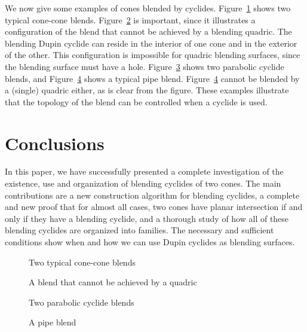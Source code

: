 We now give some examples of cones blended by cyclides.
Figure~\ref{fig:1} shows two typical cone-cone blends.
Figure~\ref{fig:2} is important, since it illustrates
a configuration of the blend that cannot be achieved by a blending quadric.
The blending Dupin cyclide can reside in the interior of one cone and
in the exterior of the other.
This configuration is impossible for quadric blending surfaces, since
the blending surface must have a hole.
Figure~\ref{fig:3} shows two parabolic cyclide blends, and Figure~\ref{fig:4}
shows a typical pipe blend.
Figure~\ref{fig:4} cannot be blended by a (single) quadric either,
as is clear from the figure.
These examples illustrate that the topology of the blend can be controlled 
when a cyclide is used.

\section{Conclusions}
\label{section:cyc-concl}

In this paper, we have successfully presented a complete investigation
of the existence, use and organization of blending cyclides of two cones.  
The main contributions are a new 
construction algorithm for blending cyclides, a complete and new proof that 
for almost all cases, two cones have planar intersection 
if and only if they have a blending cyclide, and a thorough study of how all 
of these blending cyclides are organized into families.
The necessary and sufficient conditions show
when and how we can use Dupin cyclides as blending surfaces.

\begin{figure}
\vspace{7in}
\caption{Two typical cone-cone blends}
\label{fig:1}
\end{figure}

\begin{figure}
\vspace{3.5in}
\caption{A blend that cannot be achieved by a quadric}
\label{fig:2}
\end{figure}

\begin{figure}
\vspace{7in}
\caption{Two parabolic cyclide blends}
\label{fig:3}
\end{figure}

\begin{figure}
\vspace{3.5in}
\caption{A pipe blend}
\label{fig:4}
\end{figure}

